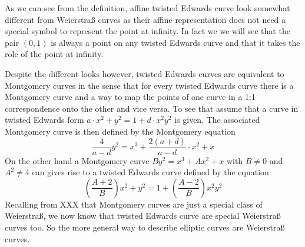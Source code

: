 As we can see from the definition, affine twisted Edwards curve look somewhat different from Weierstraß curves as their affine representation does not need a special symbol to represent the point at infinity. In fact we we will see that the pair $(0,1)$ is always a point on any twisted Edwards curve and that it takes the role of the point at infinity.

Despite the different looks however, twisted Edwards curves are equivalent to Montgomery curves in the sense that for every twisted Edwards curve there is a Montgomery curve and a way to map the points of one curve in a 1:1 correspondence onto the other and vice versa. To see that assume that a curve in twisted Edwards form $a\cdot x^2+y^2= 1+d\cdot x^2y^2$ is given. The associated Montgomery curve is then defined by the Montgomery equation
\begin{equation}
\frac{4}{a-d} y^2 = x^3 + \frac{2(a+d)}{a-d}\cdot x^2 + x
\end{equation}
On the other hand a Montgomery curve $By^{2}=x^{3}+Ax^{2}+x$ with $B\neq 0$ and $A^2\neq 4$ can gives rise to a twisted Edwards curve defined by the equation
\begin{equation}
(\frac{A+2}{B})x^2+y^2= 1+(\frac{A-2}{B})x^2y^2
\end{equation}
Recalling from XXX that Montgomery curves are just a special class of Weierstraß, we now know that twisted Edwards curve are special Weierstraß curves too. So the more general way to describe elliptic curves are Weierstraß curves.
